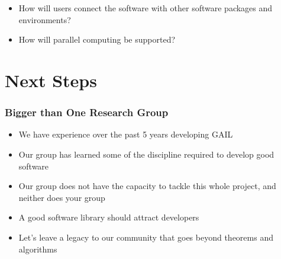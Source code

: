 \documentclass[11pt,compress,xcolor={usenames,dvipsnames},aspectratio=169]{beamer}
\begin{document}
\begin{frame}
\begin{description}
{\begin{itemize}[<+-| alert@+>]
\item How will users connect the software with other software packages and environments?

\item How will parallel computing be supported?

\end{itemize}}


\end{description}

\end{frame}

\section{Next Steps}

\begin{frame}
\frametitle{Bigger than One Research Group}

\vspace{-7ex}

\begin{itemize}
\item We have experience over the past 5 years developing GAIL

\item Our group has learned some of the discipline required to develop good software

\item Our group does not have the capacity to tackle this whole project, and neither does your group

\item A good software library should attract developers

\item Let's leave a legacy to our community that goes beyond theorems and algorithms
\end{itemize}


\end{frame}
\end{document}
